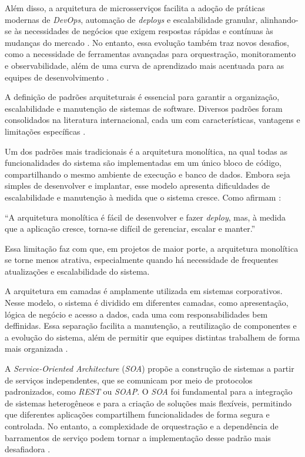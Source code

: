 Além disso, a arquitetura de microsserviços facilita a adoção de práticas modernas de \textit{DevOps}, automação de \textit{deploys} e escalabilidade granular, alinhando-se às necessidades de negócios que exigem respostas rápidas e contínuas às mudanças do mercado \cite{shekhar2023microservices}. No entanto, essa evolução também traz novos desafios, como a necessidade de ferramentas avançadas para orquestração, monitoramento e observabilidade, além de uma curva de aprendizado mais acentuada para as equipes de desenvolvimento \cite{jamshidi2016systematic}. 

A definição de padrões arquiteturais é essencial para garantir a organização, escalabilidade e manutenção de sistemas de software. Diversos padrões foram consolidados na literatura internacional, cada um com características, vantagens e limitações específicas \cite{jamshidi2016systematic}. 

Um dos padrões mais tradicionais é a arquitetura monolítica, na qual todas as funcionalidades do sistema são implementadas em um único bloco de código, compartilhando o mesmo ambiente de execução e banco de dados. Embora seja simples de desenvolver e implantar, esse modelo apresenta dificuldades de escalabilidade e manutenção à medida que o sistema cresce. Como afirmam \cite{nizami2020comparison}: 

“A arquitetura monolítica é fácil de desenvolver e fazer \textit{deploy}, mas, à medida que a aplicação cresce, torna-se difícil de gerenciar, escalar e manter.”

Essa limitação faz com que, em projetos de maior porte, a arquitetura monolítica se torne menos atrativa, especialmente quando há necessidade de frequentes atualizações e escalabilidade do sistema. 

A arquitetura em camadas é amplamente utilizada em sistemas corporativos. Nesse modelo, o sistema é dividido em diferentes camadas, como apresentação, lógica de negócio e acesso a dados, cada uma com responsabilidades bem deffinidas. Essa separação facilita a manutenção, a reutilização de componentes e a evolução do sistema, além de permitir que equipes distintas trabalhem de forma mais organizada \cite{jamshidi2016systematic}. 

A \textit{Service-Oriented Architecture} (\textit{SOA}) propõe a construção de sistemas a partir de serviços independentes, que se comunicam por meio de protocolos padronizados, como \textit{REST} ou \textit{SOAP}. O \textit{SOA} foi fundamental para a integração de sistemas heterogêneos e para a criação de soluções mais flexíveis, permitindo que diferentes aplicações compartilhem funcionalidades de forma segura e controlada. No entanto, a complexidade de orquestração e a dependência de barramentos de serviço podem tornar a implementação desse padrão mais desafiadora \cite{jamshidi2016systematic}. 


